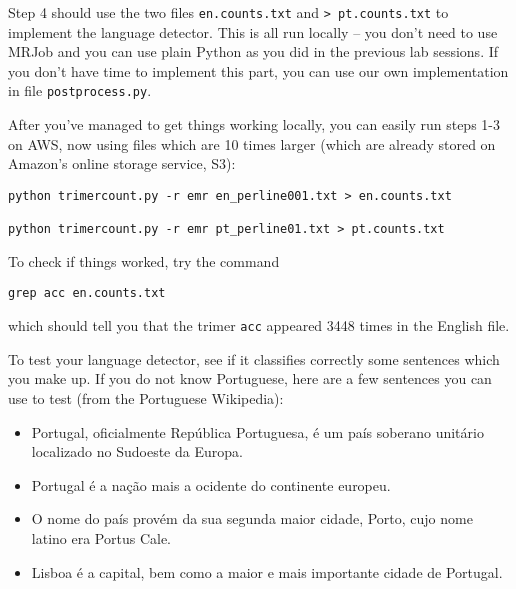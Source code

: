 Step 4 should use the two files \texttt{en.counts.txt} and \texttt{> pt.counts.txt} to implement the language detector. This is all run locally -- you don't need to use MRJob and you can use plain Python as you did in the previous lab sessions. If you don't have time to implement this part, you can use our own implementation in file \texttt{postprocess.py}.

After you've managed to get things working locally, you can easily run steps 1-3 on AWS, now using files which are 10 times larger (which are already stored on Amazon's online storage service, S3):

%

\begin{verbatim}
python trimercount.py -r emr en_perline001.txt > en.counts.txt

python trimercount.py -r emr pt_perline01.txt > pt.counts.txt
\end{verbatim}

To check if things worked, try the command

\begin{verbatim}
grep acc en.counts.txt
\end{verbatim}

which should tell you that the trimer \texttt{acc} appeared 3448 times in the English file.

To test your language detector, see if it classifies correctly some sentences which you make up. If you do not know Portuguese, here are a few sentences you can use to test (from the Portuguese Wikipedia):

\begin{itemize}
\item Portugal, oficialmente Rep\'ublica Portuguesa, \'e um pa\'is soberano unit\'ario localizado no Sudoeste da Europa.
\item Portugal \'e a na\c{c}\~ao mais a ocidente do continente europeu.
\item O nome do pa\'is prov\'em da sua segunda maior cidade, Porto, cujo nome latino era Portus Cale.
\item Lisboa \'e a capital, bem como a maior e mais importante cidade de Portugal.
\end{itemize}

